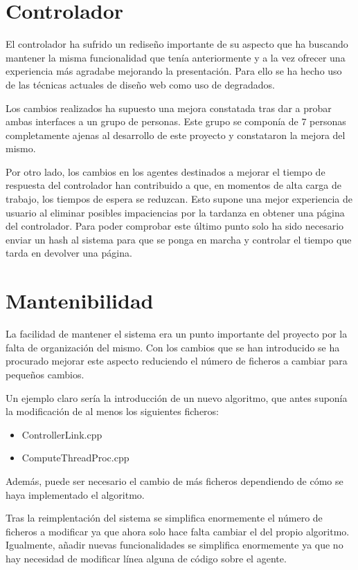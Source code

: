 \section{Controlador}

El controlador ha sufrido un rediseño importante de su aspecto que ha buscando mantener la misma funcionalidad que tenía anteriormente y a la vez ofrecer una experiencia más agradabe mejorando la presentación. Para ello se ha hecho uso de las técnicas actuales de diseño web como uso de degradados.

Los cambios realizados ha supuesto una mejora constatada tras dar a probar ambas interfaces a un grupo de personas. Este grupo se componía de 7 personas completamente ajenas al desarrollo de este proyecto y constataron la mejora del mismo.

Por otro lado, los cambios en los agentes destinados a mejorar el tiempo de respuesta del controlador han contribuido a que, en momentos de alta carga de trabajo, los tiempos de espera se reduzcan. Esto supone una mejor experiencia de usuario al eliminar posibles impaciencias por la tardanza en obtener una página del controlador. Para poder comprobar este último punto solo ha sido necesario enviar un hash al sistema para que se ponga en marcha y controlar el tiempo que tarda en devolver una página.

\section{Mantenibilidad}

La facilidad de mantener el sistema era un punto importante del proyecto por la falta de organización del mismo. Con los cambios que se han introducido se ha procurado mejorar este aspecto reduciendo el número de ficheros a cambiar para pequeños cambios.

Un ejemplo claro sería la introducción de un nuevo algoritmo, que antes suponía la modificación de al menos los siguientes ficheros:

\begin{itemize}
	\item ControllerLink.cpp
	\item ComputeThreadProc.cpp
\end{itemize}

Además, puede ser necesario el cambio de más ficheros dependiendo de cómo se haya implementado el algoritmo.

Tras la reimplentación del sistema se simplifica enormemente el número de ficheros a modificar ya que ahora solo hace falta cambiar el del propio algoritmo. Igualmente, añadir nuevas funcionalidades se simplifica enormemente ya que no hay necesidad de modificar línea alguna de código sobre el agente.

